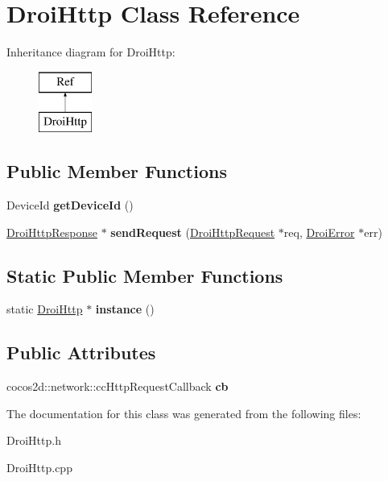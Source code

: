 \hypertarget{class_droi_http}{}\section{Droi\+Http Class Reference}
\label{class_droi_http}
Inheritance diagram for Droi\+Http\+:\begin{figure}[H]
\begin{center}
\leavevmode
\includegraphics[height=2.000000cm]{d8/d75/class_droi_http}
\end{center}
\end{figure}
\subsection*{Public Member Functions}
\begin{DoxyCompactItemize}
\item 
\mbox{\label{class_droi_http_adc274e78f1d565bef335524518ada45c}} 
Device\+Id {\bfseries get\+Device\+Id} ()
\item 
\mbox{\label{class_droi_http_a71787a1b3e0df265bba255b24552a711}} 
\hyperlink{class_droi_http_response}{Droi\+Http\+Response} $\ast$ {\bfseries send\+Request} (\hyperlink{class_droi_http_request}{Droi\+Http\+Request} $\ast$req, \hyperlink{class_droi_error}{Droi\+Error} $\ast$err)
\end{DoxyCompactItemize}
\subsection*{Static Public Member Functions}
\begin{DoxyCompactItemize}
\item 
\mbox{\label{class_droi_http_a7bd1b381fe6cf5a6da03cf98d74976db}} 
static \hyperlink{class_droi_http}{Droi\+Http} $\ast$ {\bfseries instance} ()
\end{DoxyCompactItemize}
\subsection*{Public Attributes}
\begin{DoxyCompactItemize}
\item 
\mbox{\label{class_droi_http_a1f875ae9c6bd1004bbdbcfaac1200370}} 
cocos2d\+::network\+::cc\+Http\+Request\+Callback {\bfseries cb}
\end{DoxyCompactItemize}


The documentation for this class was generated from the following files\+:\begin{DoxyCompactItemize}
\item 
Droi\+Http.\+h\item 
Droi\+Http.\+cpp\end{DoxyCompactItemize}
